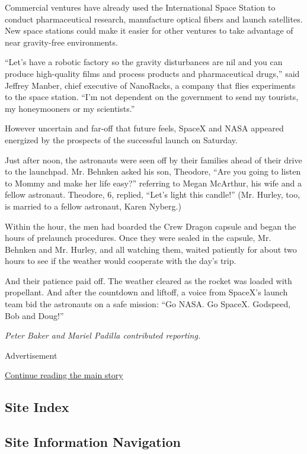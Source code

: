 Commercial ventures have already used the International Space Station to
conduct pharmaceutical research, manufacture optical fibers and launch
satellites. New space stations could make it easier for other ventures
to take advantage of near gravity-free environments.

``Let's have a robotic factory so the gravity disturbances are nil and
you can produce high-quality films and process products and
pharmaceutical drugs,'' said Jeffrey Manber, chief executive of
NanoRacks, a company that flies experiments to the space station. ``I'm
not dependent on the government to send my tourists, my honeymooners or
my scientists.''

However uncertain and far-off that future feels, SpaceX and NASA
appeared energized by the prospects of the successful launch on
Saturday.

Just after noon, the astronauts were seen off by their families ahead of
their drive to the launchpad. Mr. Behnken asked his son, Theodore, ``Are
you going to listen to Mommy and make her life easy?'' referring to
Megan McArthur, his wife and a fellow astronaut. Theodore, 6, replied,
``Let's light this candle!'' (Mr. Hurley, too, is married to a fellow
astronaut, Karen Nyberg.)

Within the hour, the men had boarded the Crew Dragon capsule and began
the hours of prelaunch procedures. Once they were sealed in the capsule,
Mr. Behnken and Mr. Hurley, and all watching them, waited patiently for
about two hours to see if the weather would cooperate with the day's
trip.

And their patience paid off. The weather cleared as the rocket was
loaded with propellant. And after the countdown and liftoff, a voice
from SpaceX's launch team bid the astronauts on a safe mission: ``Go
NASA. Go SpaceX. Godspeed, Bob and Doug!''

\emph{Peter Baker and Mariel Padilla contributed reporting.}

Advertisement

\protect\hyperlink{after-bottom}{Continue reading the main story}

\hypertarget{site-index}{%
\subsection{Site Index}\label{site-index}}

\hypertarget{site-information-navigation}{%
\subsection{Site Information
Navigation}\label{site-information-navigation}}

